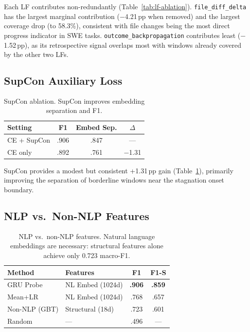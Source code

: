 \documentclass[11pt,a4paper]{article}
\begin{document}
Each LF contributes non-redundantly (Table~\ref{tab:lf-ablation}).
\texttt{file\_diff\_delta} has the largest marginal contribution ($-$4.21\,pp when removed) and the largest coverage drop (to 58.3\%), consistent with file changes being the most direct progress indicator in SWE tasks.
\texttt{outcome\_backpropagation} contributes least ($-$1.52\,pp), as its retrospective signal overlaps most with windows already covered by the other two LFs.

\subsection{SupCon Auxiliary Loss}

\begin{table}[t]
\centering
\small
\begin{tabular}{lccc}
\toprule
\textbf{Setting} & \textbf{F1} & \textbf{Embed Sep.} & \textbf{$\Delta$} \\
\midrule
CE + SupCon & .906 & .847 & --- \\
CE only & .892 & .761 & $-$1.31 \\
\bottomrule
\end{tabular}
\caption{SupCon ablation. SupCon improves embedding separation and F1.}
\label{tab:supcon}
\end{table}

SupCon provides a modest but consistent +1.31\,pp gain (Table~\ref{tab:supcon}), primarily improving the separation of borderline windows near the stagnation onset boundary.

\subsection{NLP vs.\ Non-NLP Features}

\begin{table}[t]
\centering
\small
\begin{tabular}{llcc}
\toprule
\textbf{Method} & \textbf{Features} & \textbf{F1} & \textbf{F1-S} \\
\midrule
GRU Probe & NL Embed (1024d) & \textbf{.906} & \textbf{.859} \\
Mean+LR & NL Embed (1024d) & .768 & .657 \\
Non-NLP (GBT) & Structural (18d) & .723 & .601 \\
Random & --- & .496 & --- \\
\bottomrule
\end{tabular}
\caption{NLP vs.\ non-NLP features. Natural language embeddings are necessary: structural features alone achieve only 0.723 macro-F1.}
\label{tab:non-nlp}
\end{table}
\end{document}
